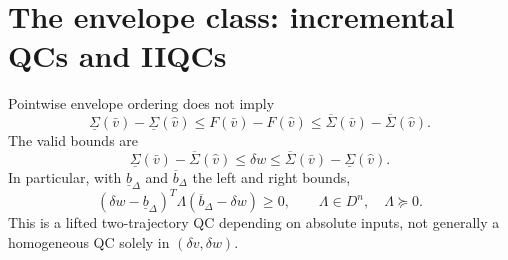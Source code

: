 \documentclass[10pt,a4paper]{article}
\theoremstyle{definition}
\theoremstyle{remark}
\begin{document}
\section{The envelope class: incremental QCs and IIQCs}
Pointwise envelope ordering does not imply
\[
 \underline\Sigma(\bar v)-\underline\Sigma(\hat v)
 \le F(\bar v)-F(\hat v)
 \le\overline\Sigma(\bar v)-\overline\Sigma(\hat v).
\]
The valid bounds are
\begin{equation}\label{eq:two-env}
 \underline\Sigma(\bar v)-\overline\Sigma(\hat v)
 \le\delta w\le
 \overline\Sigma(\bar v)-\underline\Sigma(\hat v).
\end{equation}
In particular, with $\underline b_\Delta$ and $\overline b_\Delta$ the left and right bounds,
\begin{equation}\label{eq:two-env-qc}
 (\delta w-\underline b_\Delta)^T\Lambda(\overline b_\Delta-\delta w)\ge0,
 \qquad\Lambda\in D^n,\quad\Lambda\succeq0.
\end{equation}
This is a lifted two-trajectory QC depending on absolute inputs, not generally a homogeneous QC solely in $(\delta v,\delta w)$.
\end{document}

